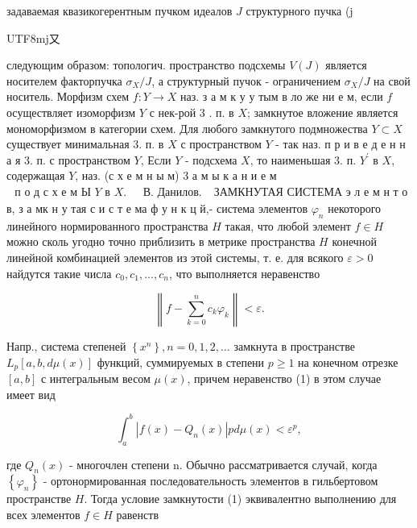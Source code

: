 \documentclass[10pt]{article}
\begin{document}
задаваемая квазикогерентным пучком идеалов $J$ структурного пучка (j\begin{CJK}{UTF8}{mj}又\end{CJK} следующим образом: топологич. пространство подсхемы $V(J)$ является носителем факторпучка $\sigma_{X} / J$, а структурный пучок - ограничением $\sigma_{X} / J$ на свой носитель. Морфизм схем $f: Y \rightarrow X$ наз. з а м к у у тым в ло же ни е м, если $f$ осуществляет изоморфизм $Y$ с нек-рой 3 . п. в $X$; замкнутое вложение является мономорфизмом в категории схем. Для любого замкнутого подмножества $Y \subset X$ существует минимальная 3. п. в $X$ с пространством $Y$ - так наз. п р и в е д е н н а я 3. п. с пространством $Y$, Если $Y$ - подсхема $X$, то наименьшая 3. п. $Y^{\prime}$ в $X$, содержащая $Y$, наз. (с х е м н ы м) 3 а м ы к а н и е м $\begin{array}{lll}\text { п о д с х е м Ы } Y \text { в } X \text {. } & \text { В. Данилов. }\end{array}$ ЗАМКНУТАЯ СИСТЕМА э л е м н т о в, з а мк н у тая с и с т е ма ф у н к ц й,- система элементов $\varphi_{n}$ некоторого линейного нормированного пространства $H$ такая, что любой элемент $f \in H$ можно сколь угодно точно приблизить в метрике пространства $H$ конечной линейной комбинацией элементов из этой системы, т. е. для всякого $\varepsilon>0$ найдутся такие числа $c_{0}, c_{1}, \ldots, c_{n}$, что выполняется неравенство



\[

\left\|f-\sum_{k=0}^{n} c_{k} \varphi_{k}\right\|<\varepsilon .

\]



Напр., система степеней $\left\{x^{n}\right\}, n=0,1,2, \ldots$ замкнута в пространстве $L_{p}[a, b, d \mu(x)]$ функций, суммируемых в степени $p \geqslant 1$ на конечном отрезке $[a, b]$ с интегральным весом $\mu(x)$, причем неравенство (1) в этом случае имеет вид



\[

\int_{a}^{b}\left|f(x)-Q_{n}(x)\right| p d \mu(x)<\varepsilon^{p},

\]



где $Q_{n}(x)$ - многочлен степени n. Обычно рассматривается случай, когда $\left\{\varphi_{n}\right\}$ - ортонормированная последовательность элементов в гильбертовом пространстве $H$. Тогда условие замкнутости (1) эквивалентно выполнению для всех элементов $f \in H$ равенств
\end{document}
